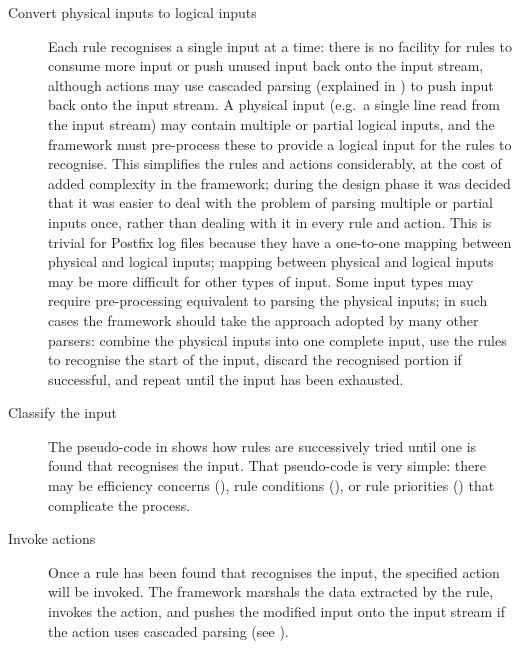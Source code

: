 \begin{description}
    \item [Convert physical inputs to logical inputs] Each rule recognises
        a single input at a time: there is no facility for rules to consume
        more input or push unused input back onto the input stream,
        although actions may use cascaded parsing (explained in
        ) to push input back onto the
        input stream.  A physical input (e.g.\ a single line read from the
        input stream) may contain multiple or partial logical inputs, and
        the framework must pre-process these to provide a logical input for
        the rules to recognise.  This simplifies the rules and actions
        considerably, at the cost of added complexity in the framework;
        during the design phase it was decided that it was easier to deal
        with the problem of parsing multiple or partial inputs once, rather
        than dealing with it in every rule and action.  This is trivial for
        Postfix log files because they have a one-to-one mapping between
        physical and logical inputs; mapping between physical and logical
        inputs may be more difficult for other types of input.  Some input
        types may require pre-processing equivalent to parsing the physical
        inputs; in such cases the framework should take the approach
        adopted by many other parsers: combine the physical inputs into one
        complete input, use the rules to recognise the start of the input,
        discard the recognised portion if successful, and repeat until the
        input has been exhausted.

    \item [Classify the input]  The pseudo-code in  shows how rules are
        successively tried until one is found that recognises the input.
        That pseudo-code is very simple: there may be efficiency concerns
        (), rule conditions
        (), or rule priorities
        () that complicate the process.

    \item [Invoke actions]  Once a rule has been found that recognises the
        input, the specified action will be invoked.  The framework
        marshals the data extracted by the rule, invokes the action, and
        pushes the modified input onto the input stream if the action uses
        cascaded parsing (see ).


\end{description}
